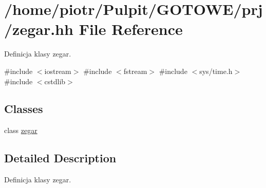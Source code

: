 \hypertarget{zegar_8hh}{\section{/home/piotr/\-Pulpit/\-G\-O\-T\-O\-W\-E/prj/zegar.hh \-File \-Reference}
\label{zegar_8hh}
}


\-Definicja klasy zegar.  


{\ttfamily \#include $<$iostream$>$}\*
{\ttfamily \#include $<$fstream$>$}\*
{\ttfamily \#include $<$sys/time.\-h$>$}\*
{\ttfamily \#include $<$cstdlib$>$}\*
\subsection*{\-Classes}
\begin{DoxyCompactItemize}
\item 
class \hyperlink{classzegar}{zegar}
\end{DoxyCompactItemize}


\subsection{\-Detailed \-Description}
\-Definicja klasy zegar. 